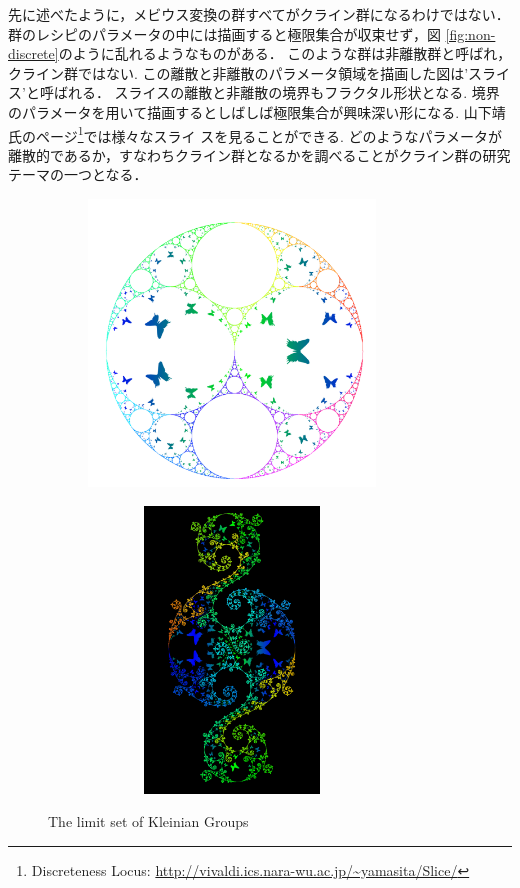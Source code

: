 先に述べたように，メビウス変換の群すべてがクライン群になるわけではない．
群のレシピのパラメータの中には描画すると極限集合が収束せず，図
\ref{fig:non-discrete}のように乱れるようなものがある．
このような群は非離散群と呼ばれ，クライン群ではない.
この離散と非離散のパラメータ領域を描画した図は'スライス'と呼ばれる．
スライスの離散と非離散の境界もフラクタル形状となる.
境界のパラメータを用いて描画するとしばしば極限集合が興味深い形になる.
山下靖氏のページ\footnote{Discreteness Locus:
\url{http://vivaldi.ics.nara-wu.ac.jp/~yamasita/Slice/}}では様々なスライ
スを見ることができる.
どのようなパラメータが離散的であるか，すなわちクライン群となるかを調べることがクライン群の研究テーマの一つとなる．


\begin{figure}[h!tbp]
 \begin{subfigure}{0.49\hsize}
   \begin{center}
    \includegraphics[width=3in, height=3in, keepaspectratio]{../img/klein/apr.pdf}
    \caption{}
    \label{fig:apr}
   \end{center}
 \end{subfigure}
 \hspace*{\fill}
 \begin{subfigure}{0.49\hsize}
   \begin{center}
    \includegraphics[width=3in, height=3in, keepaspectratio]{../img/klein/comp.pdf}
    \caption{}
    \label{fig:comp}
   \end{center}
 \end{subfigure}
 \caption{The limit set of Kleinian Groups}
 \label{fig:limitsetWithOrbit}
\end{figure}


